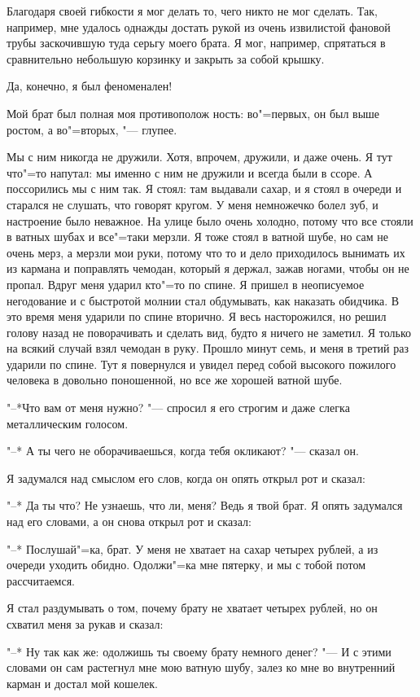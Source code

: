 Благодаря своей гибкости я мог делать то, чего никто не мог сделать. Так, например, мне удалось однажды достать рукой из
очень извилистой фановой трубы заскочившую туда серьгу моего брата. Я мог, например, спрятаться в сравнительно небольшую корзинку и закрыть за собой крышку.

Да, конечно, я был феноменален!

Мой брат был полная моя противополож ность: во"=первых, он был выше ростом, а во"=вторых, "--- глупее.
 
Мы с ним никогда не дружили. Хотя, впрочем, дружили, и даже очень. Я тут что"=то напутал: мы именно с ним не дружили и всегда
были в ссоре. А поссорились мы с ним так. Я стоял: там выдавали сахар, и я стоял в очереди и старался не слушать, что говорят кругом. 
У меня немножечко болел зуб, и настроение было неважное. На улице было очень холодно, потому что все стояли в ватных шубах и все"=таки мерзли. 
Я тоже стоял в ватной шубе, но сам не очень мерз, а мерзли мои руки, потому что то и дело приходилось вынимать их
из кармана и поправлять чемодан, который я держал, зажав ногами, чтобы он не пропал.
Вдруг меня ударил кто"=то по спине. Я пришел в неописуемое негодование и с быстротой молнии стал обдумывать, как наказать обидчика.
В это время меня ударили по спине вторично. Я весь насторожился, но решил голову назад не поворачивать и сделать вид, будто я ничего не заметил. 
Я только на всякий случай взял чемодан в руку. Прошло минут семь, и меня в третий раз ударили по спине. Тут я повернулся и увидел перед собой 
высокого пожилого человека в довольно поношенной, но все же хорошей ватной шубе.

"--*Что вам от меня нужно? "--- спросил я
его строгим и даже слегка металлическим голосом.

"--* А ты чего не оборачиваешься, когда тебя окликают? "--- сказал он.
 
Я задумался над смыслом его слов, когда он опять открыл рот и сказал:

"--* Да ты что? Не узнаешь, что ли, меня? Ведь я твой брат.
Я опять задумался над его словами, а он снова открыл рот и сказал:

"--* Послушай"=ка, брат. У меня не хватает
на сахар четырех рублей, а из очереди уходить обидно. Одолжи"=ка мне пятерку, и мы с
тобой потом рассчитаемся.
 
Я стал раздумывать о том, почему брату не хватает четырех рублей, но он схватил меня за рукав и сказал:

"--* Ну так как же: одолжишь ты своему брату немного денег? "--- И с этими словами он сам растегнул мне мою ватную шубу, залез ко мне во внутренний карман и достал мой кошелек.
 
